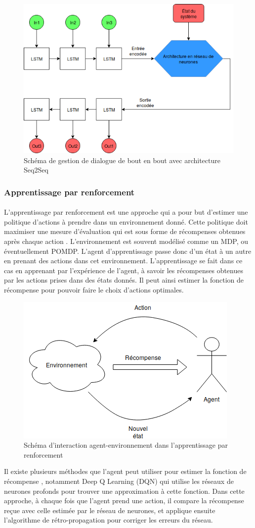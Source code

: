 \begin{figure}[H]
	\centering
	\includegraphics[width=.7\linewidth]{images/DM/DMSeq2Seq.png} 
	\caption{Schéma de gestion de dialogue de bout en bout avec architecture Seq2Seq} 
\end{figure}
\subsubsection{Apprentissage par renforcement} \label{reinf_learning}
\paragraph{}
L'apprentissage par renforcement est une approche qui a pour but d'estimer une politique d'actions à prendre dans un environnement donné. Cette politique doit maximiser une mesure d'évaluation qui est sous forme de récompenses obtenues après chaque action \citep{Weisz2018}. L'environnement est souvent modélisé comme un MDP, ou éventuellement POMDP. L'agent d'apprentissage passe donc d'un état à un autre en prenant des actions dans cet environnement. L'apprentissage se fait dans ce cas en apprenant par l'expérience de l'agent, à savoir les récompenses obtenues par les actions prises dans des états donnés. Il peut ainsi estimer la fonction de récompense pour pouvoir faire le choix d'actions optimales. 

\begin{figure}[H]
	\centering
	\includegraphics[width=.5\linewidth]{images/DM/RLSchema.png} 
	\caption{Schéma d'interaction agent-environnement dans l'apprentissage par renforcement} 
\end{figure}
Il existe plusieurs méthodes que l'agent peut utiliser pour estimer la fonction de récompense \citep{Dimitri2012}, notamment Deep Q Learning (DQN) \citep{Mnih2015} qui utilise les réseaux de neurones profonds pour trouver une approximation à cette fonction. Dans cette approche, à chaque fois que l'agent prend une action, il compare la récompense reçue avec celle estimée par le réseau de neurones, et applique ensuite l'algorithme de rétro-propagation pour corriger les erreurs du réseau. 

